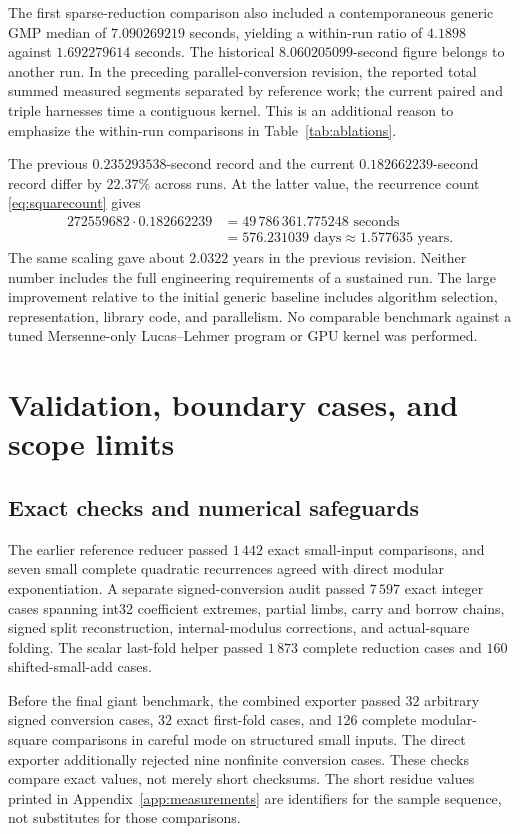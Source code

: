 \documentclass[11pt,a4paper]{article}
\theoremstyle{definition}
\begin{document}
The first sparse-reduction comparison also included a contemporaneous generic
GMP median of $7.090269219$ seconds, yielding a within-run ratio of $4.1898$
against $1.692279614$ seconds. The historical $8.060205099$-second figure
belongs to another run. In the preceding parallel-conversion revision, the
reported total summed measured segments separated by reference work; the
current paired and triple harnesses time a contiguous kernel. This is an
additional reason to emphasize the within-run comparisons in
Table~\ref{tab:ablations}.

The previous $0.235293538$-second record and the current $0.182662239$-second
record differ by $22.37\%$ across runs. At the latter value, the recurrence
count \eqref{eq:squarecount} gives
\begin{align*}
 272559682\cdot0.182662239
 &=49\,786\,361.775248\text{ seconds}\\
 &=576.231039\text{ days}\approx1.577635\text{ years}.
\end{align*}
The same scaling gave about $2.0322$ years in the previous revision. Neither
number includes the full engineering requirements of a sustained run. The
large improvement relative to the initial generic baseline includes algorithm
selection, representation, library code, and parallelism. No comparable
benchmark against a tuned Mersenne-only Lucas--Lehmer program or GPU kernel
was performed.

\section{Validation, boundary cases, and scope limits}
\label{sec:validation}

\subsection{Exact checks and numerical safeguards}

The earlier reference reducer passed $1\,442$ exact small-input comparisons,
and seven small complete quadratic recurrences agreed with direct modular
exponentiation. A separate signed-conversion audit passed $7\,597$ exact
integer cases spanning int32 coefficient extremes, partial limbs, carry and
borrow chains, signed split reconstruction, internal-modulus corrections,
and actual-square folding. The scalar last-fold helper passed $1\,873$
complete reduction cases and $160$ shifted-small-add cases.

Before the final giant benchmark, the combined exporter passed $32$ arbitrary
signed conversion cases, $32$ exact first-fold cases, and $126$ complete
modular-square comparisons in careful mode on structured small inputs.
The direct exporter additionally rejected nine nonfinite conversion cases.
These checks compare exact values, not merely short checksums. The
short residue values printed in Appendix~\ref{app:measurements} are
identifiers for the sample sequence, not substitutes for those comparisons.
\end{document}
